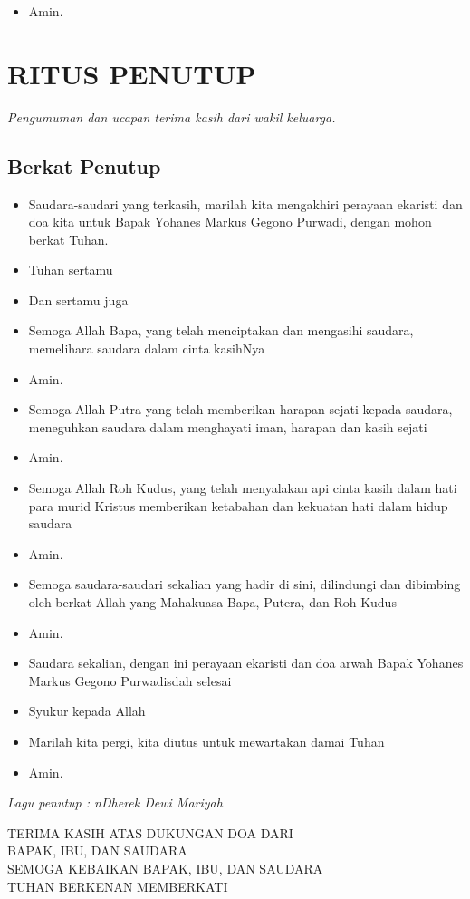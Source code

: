 \documentclass[10pt,landscape]{article}
\makeatletter
\newcommand{\lagu}[1]{%
  {\parindent \z@ 
    \interlinepenalty\@M \slshape \mdseries \large \textit{#1}\par\nobreak \vskip 10\p@ }}
\newcommand{\keterangan}[1]{%
  {\parindent \z@ 
    \interlinepenalty\@M \slshape \mdseries \textit{#1}\par\nobreak \vskip 10\p@ }}
\newcommand{\BU}[1]{\begin{itemize} \item[U:] #1 \end{itemize}}
\newcommand{\BI}[1]{\begin{itemize} \item[I:] #1 \end{itemize}}
\newcommand{\namaalm}{Bapak Yohanes Markus Gegono Purwadi}
\makeatother
\begin{document}
\begin{multicols}{3}
\BU{Amin.}

\section*{RITUS PENUTUP}

\keterangan{Pengumuman dan ucapan terima kasih dari wakil keluarga.}

\subsection*{Berkat Penutup}

\BI{Saudara-saudari yang terkasih, marilah kita mengakhiri perayaan ekaristi dan doa kita untuk \namaalm, dengan mohon berkat Tuhan.}

\BI{Tuhan sertamu}

\BU{Dan sertamu juga}

\BI{Semoga Allah Bapa, yang telah menciptakan dan mengasihi saudara, memelihara saudara dalam cinta kasihNya}

\BU{Amin.}

\BI{Semoga Allah Putra yang telah memberikan harapan sejati kepada saudara, meneguhkan saudara dalam menghayati iman, harapan dan kasih sejati}

\BU{Amin.}  

\BI{Semoga Allah Roh Kudus, yang telah menyalakan api cinta kasih dalam hati para murid Kristus memberikan ketabahan dan kekuatan hati dalam hidup saudara}

\BU{Amin.}

\BI{Semoga saudara-saudari sekalian yang hadir di sini, dilindungi dan dibimbing oleh berkat Allah yang Mahakuasa Bapa, Putera, dan Roh Kudus}

\BU{Amin.}

\BI{Saudara sekalian, dengan ini perayaan ekaristi dan doa arwah \namaalm sdah selesai}

\BU{Syukur kepada Allah}

\BI{Marilah kita pergi, kita diutus untuk mewartakan damai Tuhan}

\BU{Amin.}

\lagu{Lagu penutup : nDherek Dewi Mariyah}

\begin{center}
TERIMA KASIH ATAS DUKUNGAN DOA DARI\\
BAPAK, IBU, DAN SAUDARA\\
SEMOGA KEBAIKAN BAPAK, IBU, DAN SAUDARA\\
TUHAN BERKENAN MEMBERKATI
\end{center}
\end{multicols}
\end{document}
